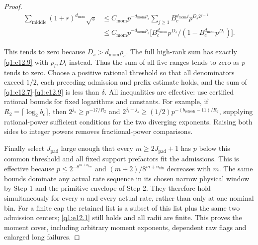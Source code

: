 \begin{proof}
\begin{equation}\label{q1:e12.9}
\begin{aligned}
\sum _{\mathrm{middle}} (1+r)^{d_{\mathrm{mom}}} \sqrt{z}
&\le C_{\mathrm{mom}} p^{-d_{\mathrm{mom}} \rho_{s}} \sum _{j\ge 1} B_{c}^{d_{\mathrm{mom}} j} p^{D_{s} 2^{j-1}}\\
&\le C_{\mathrm{mom}} p^{-d_{\mathrm{mom}} \rho_{s}} \bigl[B_{c}^{d_{\mathrm{mom}}} p^{D_{s}}/(1-B_{c}^{d_{\mathrm{mom}}} p^{D_{s}})\bigr].
\end{aligned}
\end{equation}

This tends to zero because \(D_{s}>d_{\mathrm{mom}} \rho_{s}\). The full high-rank sum has exactly \eqref{q1:e12.9} with \(\rho_{l},D_{l}\) instead. Thus the sum of all five ranges tends to zero as \(p\) tends to zero. Choose a positive rational threshold so that all denominators exceed \(1/2\), each preceding admission and prefix estimate holds, and the sum of \eqref{q1:e12.7}-\eqref{q1:e12.9} is less than \(\delta\). All inequalities are effective: use certified rational bounds for fixed logarithms and constants. For example, if \(R_{2}=\lceil \log _{2} b_{c}\rceil\), then \(2^{j_{s}}\ge p^{-17/R_{2}}\) and \(2^{j_{l}-j_{s}}\ge (1/2)p^{-(b_{\mathrm{refresh}}-11)/R_{2}}\), supplying rational-power sufficient conditions for the two diverging exponents. Raising both sides to integer powers removes fractional-power comparisons.

Finally select \(J_{\mathrm{pad}}\) large enough that every \(m\ge 2J_{\mathrm{pad}}+1\) has \(p\) below this common threshold and all fixed support prefactors fit the admissions. This is effective because \(p\le 2^{-8^{m+n_{\mathrm{bin}}}}\) and \((m+2)/8^{m+n_{\mathrm{bin}}}\) decreases with \(m\). The same bounds dominate any actual rate sequence in its chosen narrow physical window by Step 1 and the primitive envelope of Step 2. They therefore hold simultaneously for every \(n\) and every actual rate, rather than only at one nominal bin. For a finite cap the retained list is a subset of this list plus the same two admission centers; \eqref{q1:e12.1} still holds and all radii are finite. This proves the moment cover, including arbitrary moment exponents, dependent raw flags and enlarged long failures. 
\end{proof}



